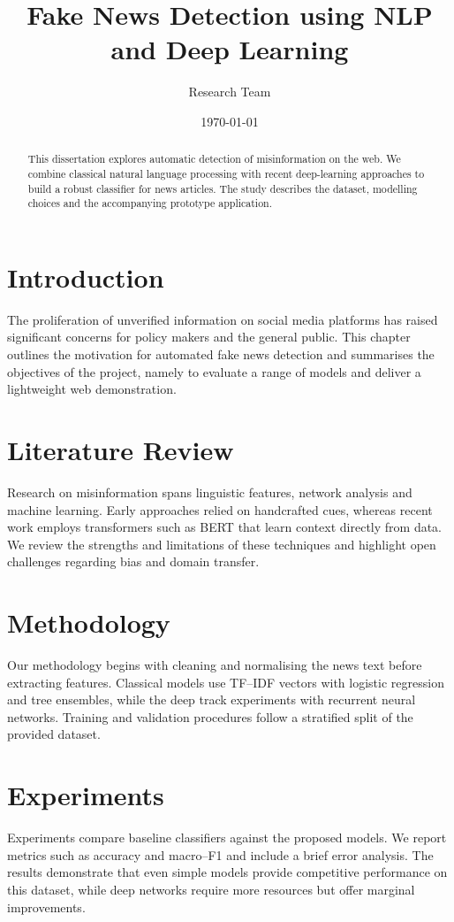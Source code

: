 \documentclass{report}
\title{Fake News Detection using NLP and Deep Learning}
\author{Research Team}
\date{\today}
\begin{document}
\maketitle
\begin{abstract}
This dissertation explores automatic detection of misinformation on the web.
We combine classical natural language processing with recent deep-learning
approaches to build a robust classifier for news articles.  The study describes
the dataset, modelling choices and the accompanying prototype application.
\end{abstract}
\tableofcontents

\chapter{Introduction}
The proliferation of unverified information on social media platforms has
raised significant concerns for policy makers and the general public.  This
chapter outlines the motivation for automated fake news detection and
summarises the objectives of the project, namely to evaluate a range of models
and deliver a lightweight web demonstration.

\chapter{Literature Review}
Research on misinformation spans linguistic features, network analysis and
machine learning.  Early approaches relied on handcrafted cues, whereas recent
work employs transformers such as BERT that learn context directly from data.
We review the strengths and limitations of these techniques and highlight open
challenges regarding bias and domain transfer.

\chapter{Methodology}
Our methodology begins with cleaning and normalising the news text before
extracting features.  Classical models use TF--IDF vectors with logistic
regression and tree ensembles, while the deep track experiments with recurrent
neural networks.  Training and validation procedures follow a stratified split
of the provided dataset.

\chapter{Experiments}
Experiments compare baseline classifiers against the proposed models.  We report
metrics such as accuracy and macro--F1 and include a brief error analysis.  The
results demonstrate that even simple models provide competitive performance on
this dataset, while deep networks require more resources but offer marginal
improvements.
\end{document}
